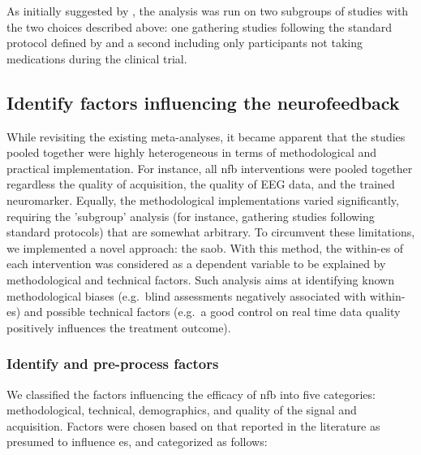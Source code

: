 As initially suggested by \citeauthor{Cortese2016}, the analysis was run on two subgroups of studies 
with the two choices described above: one gathering studies following the standard protocol defined by 
\citet{Arns2014} and a second including only participants not taking medications during the clinical trial.

\subsection{Identify factors influencing the neurofeedback}

While revisiting the existing meta-analyses, it became apparent that the studies pooled together were highly heterogeneous 
in terms of methodological and practical implementation. For instance, all \gls{nfb} 
interventions were pooled together regardless the quality of acquisition, the quality of EEG data, and the trained 
neuromarker. Equally, the methodological implementations varied significantly, requiring the 
'subgroup' analysis (for instance, gathering studies following standard protocols) that are somewhat arbitrary. To circumvent these limitations, we 
implemented a novel approach: the \gls{saob}. With this method, the within-\gls{es} of each intervention was considered 
as a dependent variable to be explained by methodological and technical factors. Such analysis aims at identifying known methodological 
biases (e.g.\ blind assessments negatively associated with within-\gls{es}) and possible technical factors (e.g.\ a good control on real time 
data quality positively influences the treatment outcome). 

\subsubsection{Identify and pre-process factors}

We classified the factors influencing the efficacy of \gls{nfb} into five categories: methodological, technical,
demographics, and quality of the signal and acquisition. 
Factors were chosen based on that reported in the literature as presumed to influence \gls{es}, and categorized as follows:


